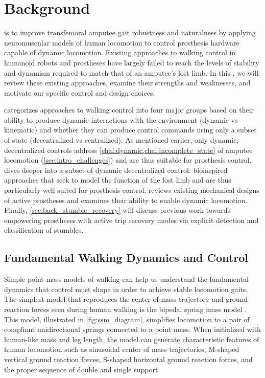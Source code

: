 \chapter{Background}\label{sec:back}
 is to improve transfemoral amputee
gait robustness and naturalness by applying neuromuscular models of human
locomotion to control prosthesis hardware capable of dynamic locomotion.
Existing approaches to walking control in humanoid robots and prostheses have
largely failed to reach the levels of stability and dynamism required to match
that of an amputee's lost limb. In this , we will review
these existing approaches, examine their strengths and weaknesses, and motivate
our specific control and design choices.

 categorizes approaches to walking control into
four major groups based on their ability to produce dynamic interactions with
the environment (dynamic vs kinematic) and whether they can produce control
commands using only a subset of state (decentralized vs centralized). As
mentioned earlier, only dynamic, decentralized controls address
\cref{chal:dynamic,chal:incomplete_state} of amputee locomotion
(\cref{sec:intro_challenges}) and are thus suitable for prosthesis control.
 dives deeper into a subset of dynamic
decentralized control: bioinspired approaches that seek to model the function of
the lost limb and are thus particularly well suited for prosthesis control.
 reviews existing mechanical designs of active
prostheses and examines their ability to enable dynamic locomotion. Finally,
\cref{sec:back_stumble_recovery} will discuss previous work towards empowering
prostheses with active trip recovery modes via explicit detection and
classification of stumbles. 

\section{Fundamental Walking Dynamics and
Control}\label{sec:back_walking_review}

Simple point-mass models of walking can help us understand the fundamental
dynamics that control must shape in order to achieve stable locomotion gaits.
The simplest model that reproduces the center of mass trajectory and ground
reaction forces seen during human walking is the bipedal spring mass model
\citep{geyer2006compliant}. This model, illustrated in \cref{fig:ssm_diagram},
simplifies locomotion to a pair of compliant unidirectional springs connected to
a point mass. When initialized with human-like mass and leg length, the model
can generate characteristic features of human locomotion such as sinusoidal
center of mass trajectories, M-shaped vertical ground reaction forces, S-shaped
horizontal ground reaction forces, and the proper sequence of double and single
support. 

